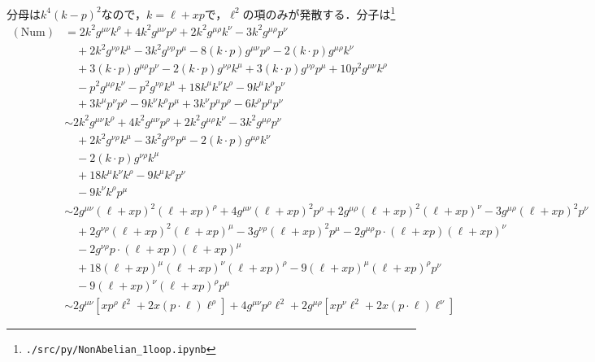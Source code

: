 分母は$k^4(k-p)^2$なので，$k=\ell+xp$で，$\ell^2$の項のみが発散する．分子は\footnote{\verb|./src/py/NonAbelian_1loop.ipynb|}
\begin{align*}
  (\text{Num}) &=
  2 k^2 g^{\mu\nu} k^{\rho}
  + 4 k^2 g^{\mu\nu} p^{\rho}
  + 2 k^2 g^{\mu\rho} k^{\nu}
  - 3 k^2 g^{\mu\rho} p^{\nu}
  \\ & \quad
  + 2 k^2 g^{\nu\rho} k^{\mu}
  - 3 k^2 g^{\nu\rho} p^{\mu}
  - 8 (k \cdot p) g^{\mu\nu} p^{\rho}
  - 2 (k \cdot p) g^{\mu\rho} k^{\nu}
  \\ & \quad
  + 3 (k \cdot p) g^{\mu\rho} p^{\nu}
  - 2 (k \cdot p) g^{\nu\rho} k^{\mu}
  + 3 (k \cdot p) g^{\nu\rho} p^{\mu}
  + 10 p^2 g^{\mu\nu} k^{\rho}
  \\ & \quad
  - p^2 g^{\mu\rho} k^{\nu}
  - p^2 g^{\nu\rho} k^{\mu}
  + 18 k^{\mu} k^{\nu} k^{\rho}
  - 9 k^{\mu} k^{\rho} p^{\nu}
  \\ & \quad
  + 3 k^{\mu} p^{\nu} p^{\rho}
  - 9 k^{\nu} k^{\rho} p^{\mu}
  + 3 k^{\nu} p^{\mu} p^{\rho}
  - 6 k^{\rho} p^{\mu} p^{\nu}
  \\
  &\sim
   2 k^2 g^{\mu\nu} k^{\rho}
  + 4 k^2 g^{\mu\nu} p^{\rho}
  + 2 k^2 g^{\mu\rho} k^{\nu}
  - 3 k^2 g^{\mu\rho} p^{\nu}
  \\ & \quad
  + 2 k^2 g^{\nu\rho} k^{\mu}
  - 3 k^2 g^{\nu\rho} p^{\mu}
  - 2 (k \cdot p) g^{\mu\rho} k^{\nu}
  \\ & \quad
  - 2 (k \cdot p) g^{\nu\rho} k^{\mu}
  \\ & \quad
  + 18 k^{\mu} k^{\nu} k^{\rho}
  - 9 k^{\mu} k^{\rho} p^{\nu}
  \\ & \quad
  - 9 k^{\nu} k^{\rho} p^{\mu}
  \\
  &\sim
  2 g^{\mu\nu} (\ell+xp)^2 (\ell+xp)^{\rho}
  + 4 g^{\mu\nu} (\ell+xp)^2 p^{\rho}
  + 2 g^{\mu\rho} (\ell+xp)^2 (\ell+xp)^{\nu}
  - 3 g^{\mu\rho} (\ell+xp)^2 p^{\nu}
  \\ & \quad
  + 2 g^{\nu\rho} (\ell+xp)^2 (\ell+xp)^{\mu}
  - 3g^{\nu\rho} (\ell+xp)^2 p^{\mu}
  - 2 g^{\mu\rho} p \cdot (\ell+xp) (\ell+xp)^{\nu}
  \\ & \quad
  - 2 g^{\nu\rho} p \cdot (\ell+xp) (\ell+xp)^{\mu}
  \\ & \quad
  + 18 (\ell+xp)^{\mu} (\ell+xp)^{\nu} (\ell+xp)^{\rho}
  - 9 (\ell+xp)^{\mu} (\ell+xp)^{\rho} p^{\nu}
  \\ & \quad
  - 9 (\ell+xp)^{\nu} (\ell+xp)^{\rho} p^{\mu}
  \\
  &\sim
   2 g^{\mu\nu} [xp^\rho\ell^2 + 2x (p \cdot\ell) \ell^\rho]
  + 4 g^{\mu\nu} p^{\rho} \ell^2
  + 2 g^{\mu\rho} [xp^\nu\ell^2 + 2x (p \cdot\ell) \ell^\nu]

\end{align*}
